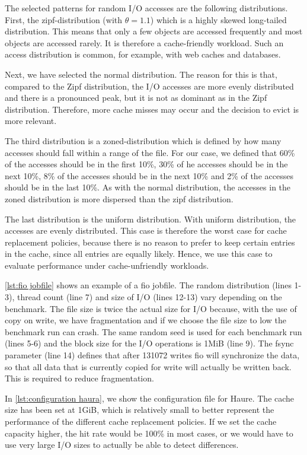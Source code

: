 \documentclass[
	12pt,
	a4paper,
	abstract,
	bibliography=totoc,
	chapterprefix,
	headings=openright,
	numbers=endperiod,
	parskip=half,
	twoside,
]{scrreprt}
\begin{document}
The selected patterns for random I/O accesses are the following distributions.
First, the zipf-distribution (with $\theta=1.1$) which is a highly skewed long-tailed distribution.
This means that only a few objects are accessed frequently and most objects are accessed rarely.
It is therefore a cache-friendly workload.
Such an access distribution is common, for example, with web caches and databases.

Next, we have selected the normal distribution.
The reason for this is that, compared to the Zipf distribution, 
the I/O accesses are more evenly distributed and there is a pronounced peak, 
but it is not as dominant as in the Zipf distribution.
Therefore, more cache misses may occur and 
the decision to evict is more relevant.

The third distribution is a zoned-distribution which is defined by 
how many accesses should fall within a range of the file.
For our case, we defined that 60\% of the accesses should be in the first 10\%,
30\% of he accesses should be in the next 10\%, 8\% of the accesses should be in the next 10\% and
2\% of the accesses should be in the last 10\%.
As with the normal distribution, the accesses in the 
zoned distribution is more dispersed than the zipf distribution.

The last distribution is the uniform distribution.
With uniform distribution, the accesses are evenly distributed.
This case is therefore the worst case for cache replacement policies, 
because there is no reason to prefer to keep certain entries in the cache, 
since all entries are equally likely.
Hence, we use this case to evaluate performance under cache-unfriendly workloads.

\cref{lst:fio jobfile} shows an example of a fio jobfile.
The random distribution (lines 1-3), thread count (line 7) and size of I/O 
(lines 12-13) vary depending on the benchmark.
The file size is twice the actual size for I/O because, with the use of  copy on write, 
we have fragmentation and if we choose the file size to low the benchmark run can crash.
The same random seed is used for each benchmark run (lines 5-6) and the block size 
for the I/O operations is 1MiB (line 9).
The fsync parameter (line 14) defines that after 131072 writes fio will synchronize the  
data, so that all data that is currently copied for write will actually be written back.
This is required to reduce fragmentation.

In \ref{lst:configuration haura}, we show the configuration file for Haure.
The cache size has been set at 1GiB, which is relatively small to better 
represent the performance of the different cache replacement policies.
If we set the cache capacity higher, the hit rate would be 100\% 
in most cases, or we would have to use very large I/O sizes to actually be able to detect differences.
\end{document}
